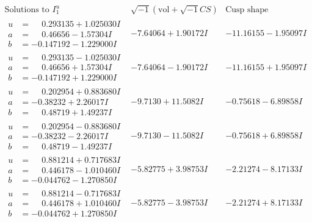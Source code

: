 \documentclass[1p]{elsarticle_modified}
\theoremstyle{definition}
\newcommand{\I}{\sqrt{-1}}
\begin{document}
$$\begin{array}{c|c|c}  
\text{Solutions to }I^u_{1}& \I (\text{vol} + \sqrt{-1}CS) & \text{Cusp shape}\\
 \hline 
\begin{aligned}
u &= \phantom{-}0.293135 + 1.025030 I \\
a &= \phantom{-}0.46656 - 1.57304 I \\
b &= -0.147192 - 1.229000 I\end{aligned}
 & -7.64064 + 1.90172 I & -11.16155 - 1.95097 I \\ \hline\begin{aligned}
u &= \phantom{-}0.293135 - 1.025030 I \\
a &= \phantom{-}0.46656 + 1.57304 I \\
b &= -0.147192 + 1.229000 I\end{aligned}
 & -7.64064 - 1.90172 I & -11.16155 + 1.95097 I \\ \hline\begin{aligned}
u &= \phantom{-}0.202954 + 0.883680 I \\
a &= -0.38232 + 2.26017 I \\
b &= \phantom{-}0.48719 + 1.49237 I\end{aligned}
 & -9.7130 + 11.5082 I & -0.75618 - 6.89858 I \\ \hline\begin{aligned}
u &= \phantom{-}0.202954 - 0.883680 I \\
a &= -0.38232 - 2.26017 I \\
b &= \phantom{-}0.48719 - 1.49237 I\end{aligned}
 & -9.7130 - 11.5082 I & -0.75618 + 6.89858 I \\ \hline\begin{aligned}
u &= \phantom{-}0.881214 + 0.717683 I \\
a &= \phantom{-}0.446178 - 1.010460 I \\
b &= -0.044762 - 1.270850 I\end{aligned}
 & -5.82775 + 3.98753 I & -2.21274 - 8.17133 I \\ \hline\begin{aligned}
u &= \phantom{-}0.881214 - 0.717683 I \\
a &= \phantom{-}0.446178 + 1.010460 I \\
b &= -0.044762 + 1.270850 I\end{aligned}
 & -5.82775 - 3.98753 I & -2.21274 + 8.17133 I \\ \hline\begin{aligned}

\end{aligned}
\end{array}$$
\end{document}
